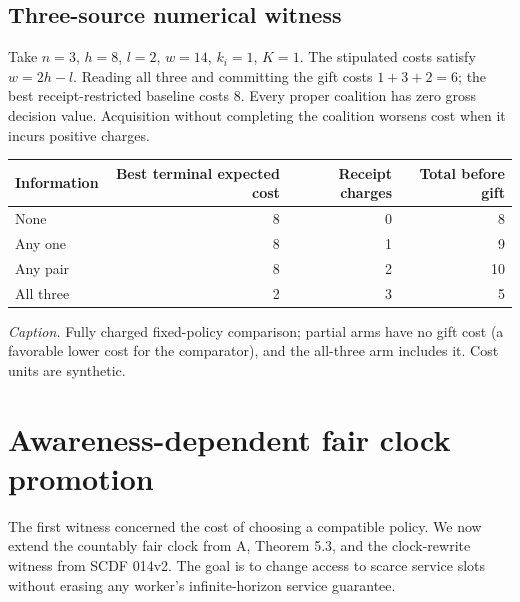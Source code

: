 \documentclass[11pt,letterpaper]{article}
\begin{document}
\subsection{Three-source numerical witness}
Take $n=3$, $h=8$, $l=2$, $w=14$, $k_i=1$, $K=1$. The stipulated costs satisfy $w=2h-l$. Reading all three and committing the gift costs $1+3+2=6$; the best receipt-restricted baseline costs $8$. Every proper coalition has zero gross decision value. Acquisition without completing the coalition worsens cost when it incurs positive charges.
\begin{center}
\begin{tabular}{lrrr}
\toprule
Information & Best terminal expected cost & Receipt charges & Total before gift \\
\midrule
None & 8 & 0 & 8\\
Any one & 8 & 1 & 9\\
Any pair & 8 & 2 & 10\\
All three & 2 & 3 & 5\\
\bottomrule
\end{tabular}
\end{center}
\begin{center}
\end{center}
\textit{Caption.} Fully charged fixed-policy comparison; partial arms have no gift cost (a favorable lower cost for the comparator), and the all-three arm includes it. Cost units are synthetic.

\section{Awareness-dependent fair clock promotion}
The first witness concerned the cost of choosing a compatible policy. We now extend the countably fair clock from A, Theorem 5.3, and the clock-rewrite witness from SCDF 014v2. The goal is to change access to scarce service slots without erasing any worker's infinite-horizon service guarantee.
\end{document}
